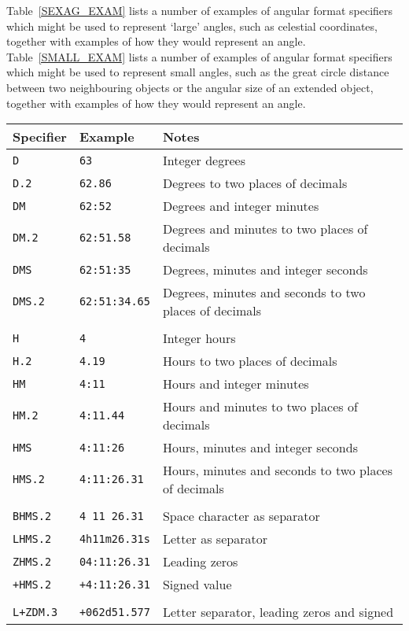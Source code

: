\documentclass[twoside,11pt]{starlink}
\begin{document}
Table~\ref{SEXAG_EXAM} lists a number of examples of angular format
specifiers which might be used to represent `large' angles, such as
celestial coordinates, together with examples of how they would
represent an angle.  Table~\ref{SMALL_EXAM} lists a number of examples of
angular format specifiers which might be used to represent small angles,
such as the great circle distance between two neighbouring objects or the
angular size of an extended object, together with examples of how they
would represent an angle.

\begin{table}[htbp]

\begin{center}
\begin{tabular}{lll}
Specifier     & Example            & Notes          \\ \hline
\texttt{D}       & \texttt{63}          & Integer degrees \\
\texttt{D.2}     & \texttt{62.86}       & Degrees to two places of decimals \\
\texttt{DM}      & \texttt{62:52}       & Degrees and integer minutes \\
\texttt{DM.2}    & \texttt{62:51.58}    & Degrees and minutes to two places of decimals \\
\texttt{DMS}     & \texttt{62:51:35}    & Degrees, minutes and integer seconds \\
\texttt{DMS.2}   & \texttt{62:51:34.65} & Degrees, minutes and seconds to two places of decimals \\
              &                    & \\
\texttt{H}       & \texttt{4}            & Integer hours \\
\texttt{H.2}     & \texttt{4.19}         & Hours to two places of decimals \\
\texttt{HM}      & \texttt{4:11}         & Hours and integer minutes \\
\texttt{HM.2}    & \texttt{4:11.44}      & Hours and minutes to two places of decimals \\
\texttt{HMS}     & \texttt{4:11:26}      & Hours, minutes and integer seconds \\
\texttt{HMS.2}   & \texttt{4:11:26.31}   & Hours, minutes and seconds to two places of decimals \\
              &                    & \\
\texttt{BHMS.2}  & \texttt{4 11 26.31}   & Space character as separator \\
\texttt{LHMS.2}  & \texttt{4h11m26.31s}  & Letter as separator \\
\texttt{ZHMS.2}  & \texttt{04:11:26.31}  & Leading zeros \\
\texttt{+HMS.2}  & \texttt{+4:11:26.31}  & Signed value \\
              &                    & \\
\texttt{L+ZDM.3} & \texttt{+062d51.577}  & Letter separator, leading zeros and signed \\
\end{tabular}


\end{center}
\end{table}
\end{document}
